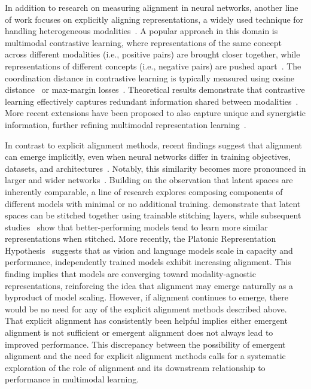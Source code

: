   In addition to research on measuring alignment in neural networks, another line of work focuses on explicitly aligning representations, a widely used technique for handling heterogeneous modalities~\citep{liang2024foundations}. A popular approach in this domain is multimodal contrastive learning, where representations of the same concept across different modalities (i.e., positive pairs) are brought closer together, while representations of different concepts (i.e., negative pairs) are pushed apart~\citep{frome2013devise,jia2021scaling,radford2021learning}. The coordination distance in contrastive learning is typically measured using cosine distance~\citep{mekhaldi2007multimodal} or max-margin losses~\citep{hu2019deep}. Theoretical results demonstrate that contrastive learning effectively captures redundant information shared between modalities~\citep{tian2020makes,tosh2021contrastive}. More recent extensions have been proposed to also capture unique and synergistic information, further refining multimodal representation learning~\citep{dufumier_what_2024,liang2023factorized}. 

 In contrast to explicit alignment methods, recent findings suggest that alignment can emerge implicitly, even when neural networks differ in training objectives, datasets, and architectures~\citep{li_convergent_2015, raghu_svcca_2017, lenc_understanding_2019, barannikov_representation_2022, bonheme_how_2022}. Notably, this similarity becomes more pronounced in larger and wider networks~\citep{raghu_svcca_2017, morcos_insights_2018, kornblith_similarity_2019}.  Building on the observation that latent spaces are inherently comparable, a line of research explores composing components of different models with minimal or no additional training. \citet{lenc_understanding_2019} demonstrate that latent spaces can be stitched together using trainable stitching layers, while subsequent studies~\citep{bansal_revisiting_2021, csiszarik_similarity_2021} show that better-performing models tend to learn more similar representations when stitched.  More recently, the Platonic Representation Hypothesis~\citep{huh_platonic_2024} suggests that as vision and language models scale in capacity and performance, independently trained models exhibit increasing alignment. This finding implies that models are converging toward modality-agnostic representations, reinforcing the idea that alignment may emerge naturally as a byproduct of model scaling. However, if alignment continues to emerge, there would be no need for any of the explicit alignment methods described above. That explicit alignment has consistently been helpful implies either emergent alignment is not sufficient or emergent alignment does not always lead to improved performance. This discrepancy between the possibility of emergent alignment and the need for explicit alignment methods calls for a systematic exploration of the role of alignment and its downstream relationship to performance in multimodal learning.